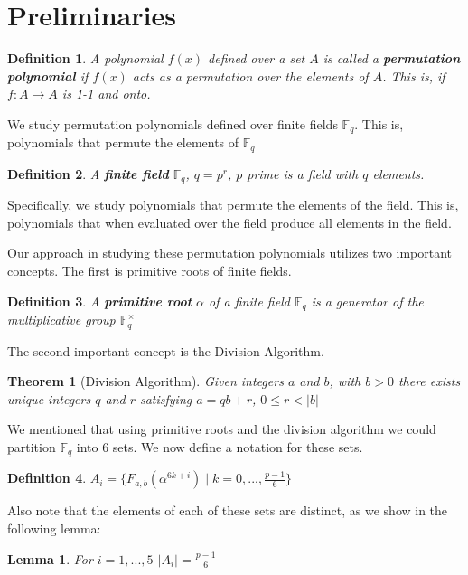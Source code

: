 \documentclass[12pt]{article}
\newtheorem{definition}{Definition}
\newtheorem{lemma}{Lemma}
\newtheorem{theorem}{Theorem}
\begin{document}
\section{Preliminaries}\label{prelim}

\begin{definition}
	A polynomial $f(x)$ defined over a set $A$ is called a \textbf{permutation polynomial} if $f(x)$ acts as a permutation over the elements of $A$. This is, if $f: A \rightarrow A$ is 1-1 and onto.
\end{definition}

We study permutation polynomials defined over finite fields $\mathbb{F}_{q}$. This is, polynomials that permute the elements of $\mathbb{F}_{q}$

\begin{definition}
	A \textbf{finite field} $\mathbb{F}_{q}$, $q=p^{r}$, $p$ prime is a field with $q$ elements.
\end{definition}

Specifically, we study polynomials that permute the elements of the field. This is, polynomials that when evaluated over the field produce all elements in the field.


Our approach in studying these permutation polynomials utilizes two important concepts. The first is primitive roots of finite fields.
\begin{definition}
	A \textbf{primitive root} $\alpha$ of a finite field $\mathbb{F}_{q}$ is a generator of the multiplicative group $\mathbb{F}_{q}^{\times}$
\end{definition}

The second important concept is the Division Algorithm.
\begin{theorem}[Division Algorithm]
	Given integers $a$ and $b$, with $b>0$ there exists unique integers $q$ and $r$ satisfying $a=qb+r$, $0 \leq r < |b|$
\end{theorem}

We mentioned that using primitive roots and the division algorithm we could partition $\mathbb{F}_{q}$ into $6$ sets. We now define a notation for these sets.

\begin{definition}
	$A_{i}=\lbrace F_{a,b}(\alpha^{6k+i}) \mid k=0,...,\frac{p-1}{6}\rbrace$
\end{definition}
Also note that the elements of each of these sets are distinct, as we show in the following lemma:
\pagebreak
\begin{lemma}
	For $i=1,...,5$ $\left\vert A_{i} \right\vert = \frac{p-1}{6}$
\end{lemma}
\end{document}

